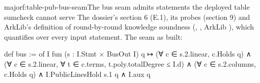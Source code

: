 \begin{finding}{major}{f:table-pub-bus-seam}{The bus seam admits statements the deployed table sumcheck cannot serve}
 The dossier's section 6 (E.1), its probes (section 9) and ArkLib's definition of
round-by-round knowledge soundness (,
, ArkLib ), which quantifies over every input
statement. The seam as built:

\begin{leancode}
def bus := of I fun (s : I.Stmt × BusOut I) q ↦ (∀ c ∈ s.2.linear, c.Holds q) ∧
  (∀ c ∈ s.2.linear, ∀ t ∈ c.terms, t.poly.totalDegree ≤ I.d) ∧
  (∀ c ∈ s.2.columns, c.Holds q) ∧ I.PublicLinesHold s.1 q ∧ I.aux q
\end{leancode}


\end{finding}
